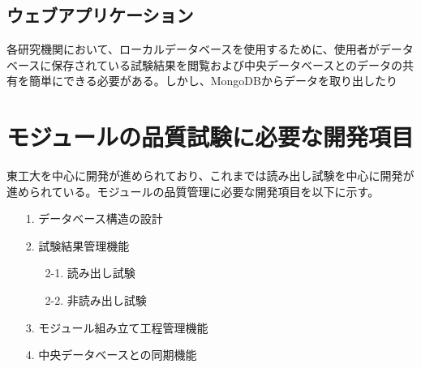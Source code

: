 \subsection{ウェブアプリケーション}
\label{sec:flask}

各研究機関において、ローカルデータベースを使用するために、使用者がデータベースに保存されている試験結果を閲覧および中央データベースとのデータの共有を簡単にできる必要がある。しかし、MongoDBからデータを取り出したり




\section{モジュールの品質試験に必要な開発項目}
\label{sec:okubottan}

東工大を中心に開発が進められており、これまでは読み出し試験を中心に開発が進められている。モジュールの品質管理に必要な開発項目を以下に示す。
\begin{itemize}
  \item[1.] データベース構造の設計
  \item[2.] 試験結果管理機能
  \begin{itemize}
    \item[2-1.] 読み出し試験
    \item[2-2.] 非読み出し試験
  \end{itemize}
  \item[3.] モジュール組み立て工程管理機能
  \item[4.] 中央データベースとの同期機能
\end{itemize}






\newpage
